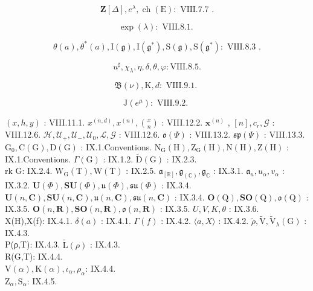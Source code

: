 \[
\mathbf {Z} [ \Delta ], e ^ {\lambda}, \operatorname{ch} (\mathrm{E}) \colon \text { VIII.7.7 }.
\]

\[
\exp (\lambda): \text {   VIII.8.1.   }
\]

\[
\theta (a), \theta^ {*} (a), \mathrm{I} (\mathfrak {g}), \mathrm{I} (\mathfrak {g} ^ {*}), \mathrm{S} (\mathfrak {g}), \mathrm{S} (\mathfrak {g} ^ {*}) \colon \text { VIII.8.3 }.
\]

\[
u ^ {\sharp}, \chi_ {\lambda}, \eta , \delta , \theta , \varphi : \mathrm{VIII.8.5}.
\]

\[
\mathfrak {B} (\nu), \mathrm{K}, d: \text {   VIII.9.1.   }
\]

\[
\mathrm{J} (e ^ {\mu}) \colon \text { VIII.9.2. }
\]

\((x,h,y)\) : VIII.11.1. \(x^{(n,d)},x^{(n)},\binom{x}{n}\) : VIII.12.2. \(\mathbf{x}^{(n)}\) , \([n],c_r,\mathcal{G}\) : VIII.12.6. \(\mathcal{H},\mathcal{U}_{+},\mathcal{U}_{-},\mathcal{U}_{0},\mathcal{L},\mathcal{G}\) : VIII.12.6. \(\mathfrak{o}(\Psi)\) : VIII.13.2. \(\mathfrak{sp}(\Psi)\) : VIII.13.3. \(\mathrm{G}_0,\mathrm{C}(\mathrm{G}),\mathrm{D}(\mathrm{G})\) : IX.1.Conventions. \(\mathrm{N_G(H),Z_G(H),N(H),Z(H)}\) : IX.1.Conventions. \(\Gamma (\mathrm{G})\) : IX.1.2. \(\tilde{\mathrm{D}} (\mathrm{G})\) : IX.2.3.\\
rk G: IX.2.4. \(\mathrm{W_G(T),W(T)}\) : IX.2.5. \(\mathfrak{a}_{[\mathbb{R}]},\mathfrak{g}_{(\mathbb{C})},\mathfrak{g}_{\mathbb{C}}\) : IX.3.1. \(\mathfrak{a}_u,u_\alpha ,v_\alpha\) : IX.3.2. \(\mathbf{U}(\varPhi),\mathbf{SU}(\varPhi),\mathfrak{u}(\varPhi),\mathfrak{s}\mathfrak{u}(\varPhi)\) : IX.3.4. \(\mathbf{U}(n,\mathbf{C}),\mathbf{SU}(n,\mathbf{C}),\mathfrak{u}(n,\mathbf{C}),\mathfrak{s}\mathfrak{u}(n,\mathbf{C})\) : IX.3.4. \(\mathbf{O}(\mathrm{Q}),\mathbf{SO}(\mathrm{Q}),\mathfrak{o}(\mathrm{Q})\) : IX.3.5. \(\mathbf{O}(n,\mathbf{R}),\mathbf{SO}(n,\mathbf{R}),\mathfrak{o}(n,\mathbf{R})\) : IX.3.5. \(U,V,K,\theta\) : IX.3.6.\\
X(H),X(f): IX.4.1. \(\delta (a)\) : IX.4.1. \(\Gamma (f)\) : IX.4.2. \(\langle a,X\rangle\) : IX.4.2. \(\tilde{\rho},\tilde{\mathrm{V}},\tilde{\mathrm{V}}_{\lambda}(\mathrm{G})\) : IX.4.3.\\
P(ρ,T): IX.4.3. \(\tilde{\mathrm{L}} (\rho)\) : IX.4.3.\\
R(G,T): IX.4.4.\\
\(\mathrm{V}(\alpha),\mathrm{K}(\alpha),\iota_{\alpha},\rho_{\alpha}\): IX.4.4.\\
\(\mathrm{Z}_{\alpha},\mathrm{S}_{\alpha}\): IX.4.5.\\
